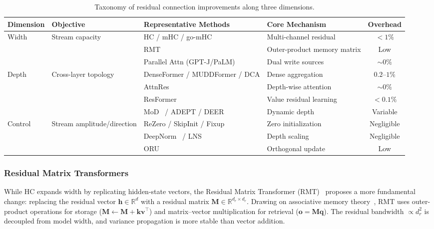 \begin{table}[t]
\centering
\caption{Taxonomy of residual connection improvements along three dimensions.}
\label{tab:residual_taxonomy}
\small
\begin{tabular}{llllc}
\hline
\textbf{Dimension} & \textbf{Objective} & \textbf{Representative Methods} & \textbf{Core Mechanism} & \textbf{Overhead} \\
\hline
\multirow{3}{*}{Width} & \multirow{3}{*}{Stream capacity} & HC / mHC / go-mHC & Multi-channel residual & $<1\%$ \\
 & & RMT~\cite{mak2025residual} & Outer-product memory matrix & Low \\
 & & Parallel Attn (GPT-J/PaLM) & Dual write sources & $\sim 0\%$ \\
\hline
\multirow{4}{*}{Depth} & \multirow{4}{*}{Cross-layer topology} & DenseFormer / MUDDFormer / DCA & Dense aggregation & $0.2$--$1\%$ \\
 & & AttnRes~\cite{kimi2026attnres} & Depth-wise attention & $\sim 0\%$ \\
 & & ResFormer~\cite{zhou2024value} & Value residual learning & $<0.1\%$ \\
 & & MoD~\cite{raposo2024mixture} / ADEPT / DEER & Dynamic depth & Variable \\
\hline
\multirow{3}{*}{Control} & \multirow{3}{*}{Stream amplitude/direction} & ReZero / SkipInit / Fixup & Zero initialization & Negligible \\
 & & DeepNorm~\cite{wang2024deepnet} / LNS & Depth scaling & Negligible \\
 & & ORU~\cite{oh2025revisiting} & Orthogonal update & Low \\
\hline
\end{tabular}
\end{table}

\subsubsection{Residual Matrix Transformers}

While HC expands width by replicating hidden-state vectors, the Residual Matrix Transformer (RMT)~\cite{mak2025residual} proposes a more fundamental change: replacing the residual vector $\mathbf{h} \in \mathbb{R}^d$ with a residual matrix $\mathbf{M} \in \mathbb{R}^{d_r \times d_r}$. Drawing on associative memory theory~\cite{kohonen1972correlation}, RMT uses outer-product operations for storage ($\mathbf{M} \leftarrow \mathbf{M} + \mathbf{k}\mathbf{v}^\top$) and matrix--vector multiplication for retrieval ($\mathbf{o} = \mathbf{M}\mathbf{q}$). The residual bandwidth $\propto d_r^2$ is decoupled from model width, and variance propagation is more stable than vector addition.

